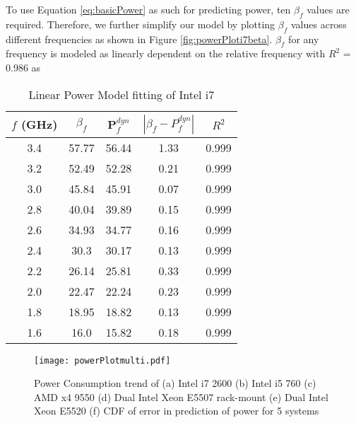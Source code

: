 \documentclass{sig-alternate}
\begin{document}
To use Equation \ref{eq:basicPower} as such for predicting power, ten $\beta_f$ values are required. Therefore, we further simplify our model by plotting $\beta_f$ values across different frequencies as shown in Figure \ref{fig:powerPloti7beta}. $\beta_f$ for any frequency is modeled as linearly dependent on the relative frequency with $R^2$ = 0.986 as 
\begin{table}[!htbp]
\caption{Linear Power Model fitting of Intel i7}
\begin{center}
\begin{tabular}{|c|c|c|c|c|}
\hline
\textbf{$f$ (GHz)} & \textbf{$\beta_f$} & \textbf{P$^{dyn}_f$} & $| \beta_f - P^{dyn}_f |$ & \textbf{$R^2$}\\ \hline
3.4 & 57.77 & 56.44 & 1.33 & 0.999\\ \hline
3.2 & 52.49 & 52.28 & 0.21 & 0.999\\ \hline
3.0 & 45.84 & 45.91 & 0.07 & 0.999\\ \hline
2.8 & 40.04 & 39.89 & 0.15 & 0.999\\ \hline
2.6 & 34.93 & 34.77 & 0.16 & 0.999\\ \hline
2.4 & 30.3 & 30.17 & 0.13 & 0.999\\ \hline
2.2 & 26.14 & 25.81 & 0.33 & 0.999\\ \hline
2.0 & 22.47 & 22.24 & 0.23 & 0.999\\ \hline
1.8 & 18.95 & 18.82 & 0.13 & 0.999\\ \hline
1.6 & 16.0 & 15.82 & 0.18 & 0.999\\ \hline
\end{tabular}
\end{center}
\label{fittingi7}
\vspace{-0.5cm}
\end{table}


 \begin{figure*}[t]
\centering
\texttt{[image: powerPlotmulti.pdf]}
\caption{Power Consumption trend of (a) Intel i7 2600 (b) Intel i5 760 (c) AMD x4 9550 (d) Dual Intel Xeon E5507 rack-mount (e) Dual Intel Xeon E5520 (f) CDF of error in prediction of power for 5 systems}
\label{fig:powerPlotmulti}
 \vspace{-0.5cm}
\end{figure*}
\end{document}
